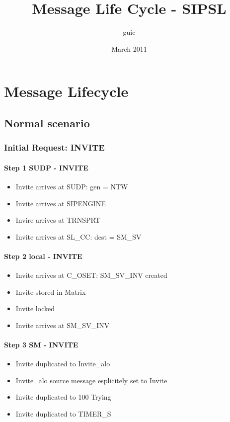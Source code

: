 \documentclass[a4paper]{report}
\title{Message Life Cycle - SIPSL}
\author{guic}
\date{March 2011}
\begin{document}
	\small
	\maketitle 
\chapter{Message Lifecycle}

\section{Normal scenario}

\subsection{Initial Request: INVITE}

\subsubsection{Step 1 SUDP - INVITE} 
\begin{itemize}
   \item Invite arrives at SUDP: gen = NTW
   \item Invite arrives at SIPENGINE
   \item Invire arrives at TRNSPRT
   \item Invite arrives at SL\_CC: dest = SM\_SV
\end{itemize}

\subsubsection{Step 2 local - INVITE}
\begin{itemize}
   \item Invite arrives at C\_OSET: SM\_SV\_INV created
   \item Invite stored in Matrix
   \item Invite locked
   \item Invite arrives at SM\_SV\_INV
\end{itemize}

\subsubsection{Step 3 SM - INVITE} 
\begin{itemize}
   \item Invite duplicated to Invite\_alo
   \item Invite\_alo source message esplicitely set to Invite
   \item Invite duplicated to 100 Trying
   \item Invite duplicated to TIMER\_S 
\end{itemize}
 
\end{document}

